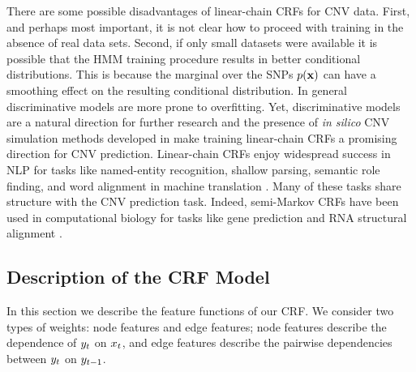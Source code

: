 There are some possible disadvantages of linear-chain CRFs for CNV data. First, and perhaps most important, it is not clear how to proceed with training in the absence of real data sets. Second, if only small datasets were available it is possible that the HMM training procedure results in better conditional distributions. This is because the marginal over the SNPs $p(\mathbf{x})$ can have a smoothing effect on the resulting conditional distribution. In general discriminative models are more prone to overfitting. Yet, discriminative models are a natural direction for further research and the presence of \textit{in silico} CNV simulation methods developed in \cite{rampasek2014fcnv} make training linear-chain CRFs a promising direction for CNV prediction. Linear-chain CRFs enjoy widespread success in NLP for tasks like named-entity recognition, shallow parsing, semantic role finding, and word alignment in machine translation \citep{sutton2012}. Many of these tasks share structure with the CNV prediction task.  Indeed, semi-Markov CRFs have been used in computational biology for tasks like gene prediction \citep{bernal2007} and RNA structural alignment \citep{Sato01012005}.

\subsection{Description of the CRF Model}
In this section we describe the feature functions of our CRF. We consider two types of weights: node features and edge features; node features describe the dependence of $y_{t}$ on $x_{t}$, and edge features describe the pairwise dependencies between $y_{t}$ on $y_{t - 1}$.

